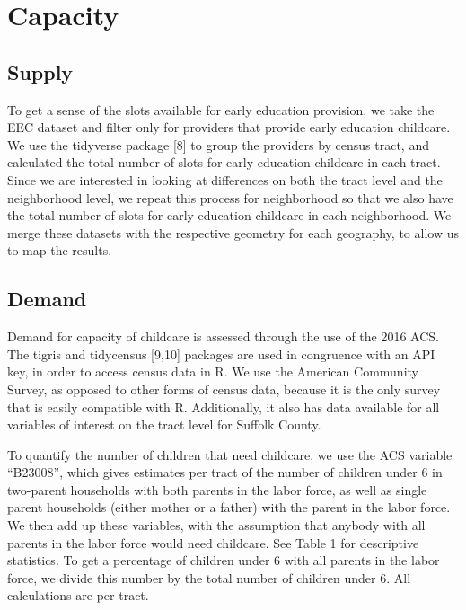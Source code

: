 \documentclass[10pt,letterpaper]{article}
\begin{document}
\section{Capacity}\label{capacity}

\subsection{Supply}\label{supply}

To get a sense of the slots available for early education provision, we
take the EEC dataset and filter only for providers that provide early
education childcare. We use the tidyverse package {[}8{]} to group the
providers by census tract, and calculated the total number of slots for
early education childcare in each tract. Since we are interested in
looking at differences on both the tract level and the neighborhood
level, we repeat this process for neighborhood so that we also have the
total number of slots for early education childcare in each
neighborhood. We merge these datasets with the respective geometry for
each geography, to allow us to map the results.

\subsection{Demand}\label{demand}

Demand for capacity of childcare is assessed through the use of the 2016
ACS. The tigris and tidycensus {[}9,10{]} packages are used in
congruence with an API key, in order to access census data in R. We use
the American Community Survey, as opposed to other forms of census data,
because it is the only survey that is easily compatible with R.
Additionally, it also has data available for all variables of interest
on the tract level for Suffolk County.

To quantify the number of children that need childcare, we use the ACS
variable ``B23008'', which gives estimates per tract of the number of
children under 6 in two-parent households with both parents in the labor
force, as well as single parent households (either mother or a father)
with the parent in the labor force. We then add up these variables, with
the assumption that anybody with all parents in the labor force would
need childcare. See Table 1 for descriptive statistics. To get a
percentage of children under 6 with all parents in the labor force, we
divide this number by the total number of children under 6. All
calculations are per tract.
\end{document}
